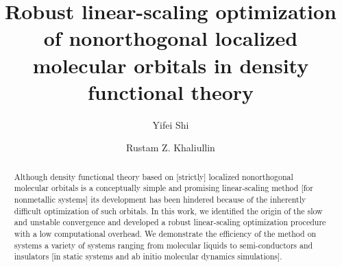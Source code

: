 \documentclass[aps,prl,twocolumn,reprint,amsmath,amssymb]{revtex4-1}
\begin{document}
\newcommand{\Ang}{\ensuremath{\mathring{\text{A}}}}
\newcommand{\ltwid}{\mathrel{\raise.3ex\hbox{$<$\kern-.75em\lower1ex\hbox{$\sim$}}}}
\newcommand{\gtwid}{\mathrel{\raise.3ex\hbox{$>$\kern-.75em\lower1ex\hbox{$\sim$}}}}
\newcommand{\bra}{\langle}
\newcommand{\ket}{\rangle}
\newcommand{\sill}{\psi}
\newcommand{\trace}{{\rm Tr}}
\newcommand{\ntilde}{\tilde{n}}
\newcommand{\stilde}{\tilde{s}}
\newcommand{\atilde}{\tilde{\alpha}}
\newcommand{\new}{\color{red}}
\newcommand{\old}{\color{black}}
\newcommand{\bea}{\begin{eqnarray}}
\newcommand{\eea}{\end{eqnarray}}
\newcommand{\br}{\ensuremath{\mathbf{r}}}
\def\nn{\nonumber\\}



\title{Robust linear-scaling optimization of nonorthogonal localized molecular orbitals in density functional theory}

\author{Yifei Shi}
\author{Rustam Z. Khaliullin}


\begin{abstract}
Although density functional theory based on [strictly] localized nonorthogonal molecular orbitals is a conceptually simple and promising linear-scaling method [for nonmetallic systems] its development has been hindered because of the inherently difficult optimization of such orbitals. 
In this work, we identified the origin of the slow and unstable convergence and developed a robust linear-scaling optimization procedure with a low computational overhead. 
We demonstrate the efficiency of the method on systems a variety of systems ranging from molecular liquids to semi-conductors and insulators [in static systems and ab initio molecular dynamics simulations]. 
\end{abstract}
\maketitle
\end{document}
